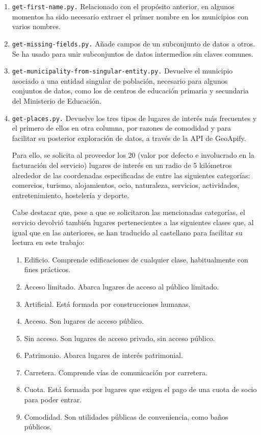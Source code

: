 \begin{enumerate}
    \item \texttt{get-first-name.py.} Relacionado con el propósito anterior, en algunos momentos ha sido necesario extraer el primer nombre en los municipios con varios nombres.
    
    \item \texttt{get-missing-fields.py.} Añade campos de un subconjunto de datos a otros. Se ha usado para unir subconjuntos de datos intermedios sin claves comunes.
    
    \item \texttt{get-municipality-from-singular-entity.py.} Devuelve el municipio asociado a una entidad singular de población, necesario para algunos conjuntos de datos, como los de centros de educación primaria y secundaria del Ministerio de Educación.
    
    \item \texttt{get-places.py.} Devuelve los tres tipos de lugares de interés más frecuentes y el primero de ellos en otra columna, por razones de comodidad y para facilitar su posterior exploración de datos, a través de la API de GeoApify.

    Para ello, se solicita al proveedor los 20 (valor por defecto e involucrado en la facturación del servicio) lugares de interés en un radio de 5 kilómetros alrededor de las coordenadas especificadas de entre las siguientes categorías: comercios, turismo, alojamientos, ocio, naturaleza, servicios, actividades, entretenimiento, hostelería y deporte.

    Cabe destacar que, pese a que se solicitaron las mencionadas categorías, el servicio devolvió también lugares pertenecientes a las siguientes clases que, al igual que en las anteriores, se han traducido al castellano para facilitar su lectura en este trabajo:

    \begin{enumerate}
        \item Edificio. Comprende edificaciones de cualquier clase, habitualmente con fines prácticos.
        \item Acceso limitado. Abarca lugares de acceso al público limitado.
        \item Artificial. Está formada por construcciones humanas.
        \item Acceso. Son lugares de acceso público.
        \item Sin acceso. Son lugares de acceso privado, sin acceso público.
        \item Patrimonio. Abarca lugares de interés patrimonial.
        \item Carretera. Comprende vías de comunicación por carretera.
        \item Cuota. Está formada por lugares que exigen el pago de una cuota de socio para poder entrar.
        \item Comodidad. Son utilidades públicas de conveniencia, como baños públicos.
    \end{enumerate}
    

\end{enumerate}
